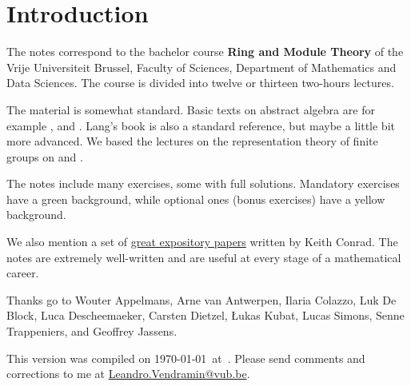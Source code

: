 \section*{Introduction}

The notes correspond to the bachelor 
course \textbf{Ring and Module Theory} of the 
Vrije Universiteit Brussel, 
Faculty of Sciences, 
Department of Mathematics and Data Sciences. The course
is divided into twelve or thirteen two-hours lectures. 

The material is somewhat standard. Basic texts on abstract algebra
are for example \cite{MR1129886}, \cite{MR2286236} and \cite{MR600654}. 
Lang's book \cite{MR783636} is also a standard reference, but 
maybe a little bit more advanced. 
We based the lectures on the representation theory of finite
groups on \cite{MR0450380} and 
\cite{MR2867444}. 

The notes include many exercises, some with full solutions. Mandatory exercises have a green background, while optional ones (bonus exercises) have a yellow background.

We also mention a set of \href{https://kconrad.math.uconn.edu/blurbs/}{great expository papers} written 
by Keith Conrad. 
The notes are extremely well-written and are useful at  
every stage of a mathematical career. 


Thanks go to Wouter Appelmans, Arne van Antwerpen, Ilaria Colazzo, Luk De Block, 
Luca Descheemaeker, Carsten Dietzel, {\L}ukas Kubat, Lucas Simons, Senne Trappeniers, 
and Geoffrey Jassens. 

This version 
was compiled on \today~at~\currenttime. 
Please send comments and corrections to me at \url{Leandro.Vendramin@vub.be}. 


